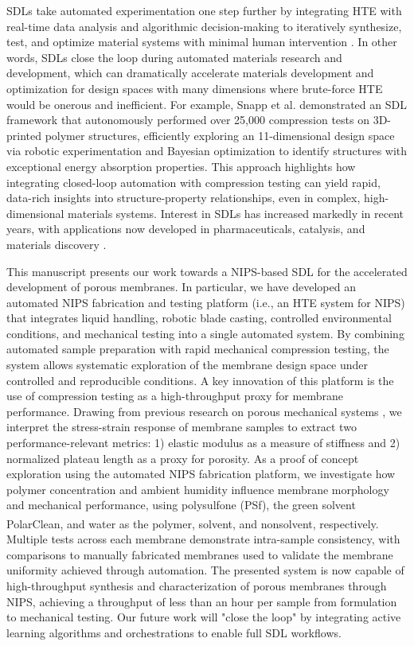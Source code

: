 \documentclass[preprint,12pt,times]{elsarticle}
\begin{document}
SDLs take automated experimentation one step further by integrating HTE with real-time data analysis and algorithmic decision-making to iteratively synthesize, test, and optimize material systems with minimal human intervention \cite{STACH20212702, Tom2024, Abolhasani2023}. In other words, SDLs close the loop during automated materials research and development, which can dramatically accelerate materials development and optimization for design spaces with many dimensions where brute-force HTE would be onerous and inefficient. For example, Snapp et al. \cite{Snapp2024} demonstrated an SDL framework that autonomously performed over 25,000 compression tests on 3D-printed polymer structures, efficiently exploring an 11-dimensional design space via robotic experimentation and Bayesian optimization to identify structures with exceptional energy absorption properties. This approach highlights how integrating closed-loop automation with compression testing can yield rapid, data-rich insights into structure-property relationships, even in complex, high-dimensional materials systems. Interest in SDLs has increased markedly in recent years, with applications now developed in pharmaceuticals, catalysis, and materials discovery \cite{Mennen2019, MA2025, Szymanski2023}. 

This manuscript presents our work towards a NIPS-based SDL for the accelerated development of porous membranes. In particular, we have developed an automated NIPS fabrication and testing platform (i.e., an HTE system for NIPS) that integrates liquid handling, robotic blade casting, controlled environmental conditions, and mechanical testing into a single automated system. By combining automated sample preparation with rapid mechanical compression testing, the system allows systematic exploration of the membrane design space under controlled and reproducible conditions. A key innovation of this platform is the use of compression testing as a high-throughput proxy for membrane performance. Drawing from previous research on porous mechanical systems \cite{Gongora2020, Costa2008, Feng2019}, we interpret the stress-strain response of membrane samples to extract two performance-relevant metrics: 1) elastic modulus as a measure of stiffness and 2) normalized plateau length as a proxy for porosity. As a proof of concept exploration using the automated NIPS fabrication platform, we investigate how polymer concentration and ambient humidity influence membrane morphology and mechanical performance, using polysulfone (PSf), the green solvent PolarClean\textsuperscript{\textregistered}, and water as the polymer, solvent, and nonsolvent, respectively. Multiple tests across each membrane demonstrate intra-sample consistency, with comparisons to manually fabricated membranes used to validate the membrane uniformity achieved through automation. The presented system is now capable of high-throughput synthesis and characterization of porous membranes through NIPS, achieving a throughput of less than an hour per sample from formulation to mechanical testing. Our future work will "close the loop" by integrating active learning algorithms and orchestrations to enable full SDL workflows. 
\end{document}
